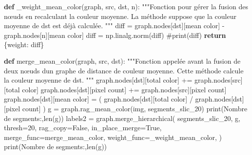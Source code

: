 \documentclass[
  11pt,
  letterpaper,
  open=any,
  twoside=false,
  french]{scrbook}
\newenvironment{Shaded}{\begin{snugshade}}{\end{snugshade}}
\newcommand{\BuiltInTok}[1]{\textcolor[rgb]{0.00,0.23,0.31}{#1}}
\newcommand{\CommentTok}[1]{\textcolor[rgb]{0.37,0.37,0.37}{#1}}
\newcommand{\ControlFlowTok}[1]{\textcolor[rgb]{0.00,0.23,0.31}{\textbf{#1}}}
\newcommand{\DecValTok}[1]{\textcolor[rgb]{0.68,0.00,0.00}{#1}}
\newcommand{\KeywordTok}[1]{\textcolor[rgb]{0.00,0.23,0.31}{\textbf{#1}}}
\newcommand{\NormalTok}[1]{\textcolor[rgb]{0.00,0.23,0.31}{#1}}
\newcommand{\OperatorTok}[1]{\textcolor[rgb]{0.37,0.37,0.37}{#1}}
\newcommand{\StringTok}[1]{\textcolor[rgb]{0.13,0.47,0.30}{#1}}
\newcommand{\VariableTok}[1]{\textcolor[rgb]{0.07,0.07,0.07}{#1}}
\begin{document}
\begin{Shaded}
\begin{Highlighting}[]
\KeywordTok{def}\NormalTok{ \_weight\_mean\_color(graph, src, dst, n):}
    \CommentTok{"""Fonction pour gérer la fusion des nœuds en recalculant la couleur moyenne.}
\CommentTok{    La méthode suppose que la couleur moyenne de \textasciigrave{}dst\textasciigrave{} est déjà calculée.}
\CommentTok{    """}
\NormalTok{    diff }\OperatorTok{=}\NormalTok{ graph.nodes[dst][}\StringTok{\textquotesingle{}mean color\textquotesingle{}}\NormalTok{] }\OperatorTok{{-}}\NormalTok{ graph.nodes[n][}\StringTok{\textquotesingle{}mean color\textquotesingle{}}\NormalTok{]}
\NormalTok{    diff }\OperatorTok{=}\NormalTok{ np.linalg.norm(diff)}
    \CommentTok{\#print(diff)}
    \ControlFlowTok{return}\NormalTok{ \{}\StringTok{\textquotesingle{}weight\textquotesingle{}}\NormalTok{: diff\}}


\KeywordTok{def}\NormalTok{ merge\_mean\_color(graph, src, dst):}
    \CommentTok{"""Fonction appelée avant la fusion de deux nœuds d\textquotesingle{}un graphe de distance de couleur moyenne.}
\CommentTok{      Cette méthode calcule la couleur moyenne de \textasciigrave{}dst\textasciigrave{}.}
\CommentTok{    """}
\NormalTok{    graph.nodes[dst][}\StringTok{\textquotesingle{}total color\textquotesingle{}}\NormalTok{] }\OperatorTok{+=}\NormalTok{ graph.nodes[src][}\StringTok{\textquotesingle{}total color\textquotesingle{}}\NormalTok{]}
\NormalTok{    graph.nodes[dst][}\StringTok{\textquotesingle{}pixel count\textquotesingle{}}\NormalTok{] }\OperatorTok{+=}\NormalTok{ graph.nodes[src][}\StringTok{\textquotesingle{}pixel count\textquotesingle{}}\NormalTok{]}
\NormalTok{    graph.nodes[dst][}\StringTok{\textquotesingle{}mean color\textquotesingle{}}\NormalTok{] }\OperatorTok{=}\NormalTok{ (}
\NormalTok{        graph.nodes[dst][}\StringTok{\textquotesingle{}total color\textquotesingle{}}\NormalTok{] }\OperatorTok{/}\NormalTok{ graph.nodes[dst][}\StringTok{\textquotesingle{}pixel count\textquotesingle{}}\NormalTok{]}
\NormalTok{    )}
\NormalTok{g }\OperatorTok{=}\NormalTok{ graph.rag\_mean\_color(img, segments\_slic\_20)}
\BuiltInTok{print}\NormalTok{(}\StringTok{\textquotesingle{}Nombre de segments:\textquotesingle{}}\NormalTok{,}\BuiltInTok{len}\NormalTok{(g))}
\NormalTok{labels2 }\OperatorTok{=}\NormalTok{ graph.merge\_hierarchical(}
\NormalTok{    segments\_slic\_20,}
\NormalTok{    g,}
\NormalTok{    thresh}\OperatorTok{=}\DecValTok{20}\NormalTok{,}
\NormalTok{    rag\_copy}\OperatorTok{=}\VariableTok{False}\NormalTok{,}
\NormalTok{    in\_place\_merge}\OperatorTok{=}\VariableTok{True}\NormalTok{,}
\NormalTok{    merge\_func}\OperatorTok{=}\NormalTok{merge\_mean\_color,}
\NormalTok{    weight\_func}\OperatorTok{=}\NormalTok{\_weight\_mean\_color,}
\NormalTok{)}
\BuiltInTok{print}\NormalTok{(}\StringTok{\textquotesingle{}Nombre de segments:\textquotesingle{}}\NormalTok{,}\BuiltInTok{len}\NormalTok{(g))}


\end{Highlighting}
\end{Shaded}
\end{document}
